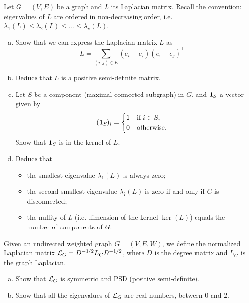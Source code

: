 \begin{myexercise}\label{prob:graph_laplacian_matrix}
    Let $G = (V,E)$ be a graph and $L$ its Laplacian matrix. Recall the convention: eigenvalues of $L$ are ordered in non-decreasing order, i.e. $\lambda_1(L) \leq \lambda_2(L) \leq \ldots \leq \lambda_n(L)$.
    \begin{enumerate}[(a)]
        \item Show that we can express the Laplacian matrix $L$ as
        \begin{equation*}
            L = \sum_{(i,j) \in E} (e_i - e_j)(e_i - e_j)^\top
        \end{equation*}
        
        \item Deduce that $L$ is a positive semi-definite matrix.

        \item Let $S$ be a component (maximal connected subgraph) in $G$, and $\mathbf{1}_S$ a vector given by
        \begin{equation*}
            (\mathbf{1}_S)_i = \begin{cases}
                1 &\text{if } i\in S,\\
                0 &\text{otherwise}.
            \end{cases}
        \end{equation*}
        Show that $\mathbf{1}_S$ is in the kernel of $L$.

        \item Deduce that
        \begin{itemize}
            \item the smallest eigenvalue $\lambda_1(L)$ is always zero;
            \item the second smallest eigenvalue $\lambda_2(L)$ is zero if and only if $G$ is disconnected;
            \item the nullity of $L$ (i.e. dimension of the kernel $\ker(L)$) equals the number of components of $G$.
        \end{itemize}
    \end{enumerate} 
\end{myexercise}

\begin{myexercise}\label{prob:normalized_laplacian}
    Given an undirected weighted graph $G = (V, E, W)$, we define the normalized Laplacian matrix $\mathcal{L}_G = D^{-1/2} L_G D^{-1/2}$, where $D$ is the degree matrix and $L_G$ is the graph Laplacian.
    \begin{enumerate}[(a)]
        \item Show that $\mathcal{L}_G$ is symmetric and PSD (positive semi-definite).
        
        \item Show that all the eigenvalues of $\mathcal{L}_G$ are real numbers, between $0$ and $2$.
    \end{enumerate}
\end{myexercise}


